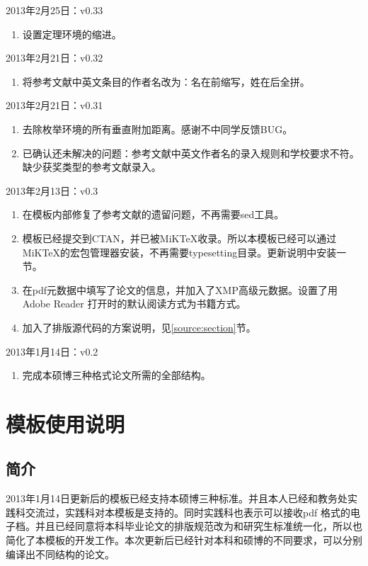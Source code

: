 \noindent
2013年2月25日：v0.33
\begin{enumerate}
\item 设置定理环境的缩进。
\end{enumerate}


\noindent
2013年2月21日：v0.32
\begin{enumerate}
\item 将参考文献中英文条目的作者名改为：名在前缩写，姓在后全拼。
\end{enumerate}

\noindent
2013年2月21日：v0.31
\begin{enumerate}
\item 去除枚举环境的所有垂直附加距离。感谢不中同学反馈BUG。
\item 已确认还未解决的问题：参考文献中英文作者名的录入规则和学校要求不符。缺少获奖类型的参考文献录入。
\end{enumerate}

\noindent
2013年2月13日：v0.3
\begin{enumerate}
\item 在模板内部修复了参考文献的遗留问题，不再需要sed工具。
\item 模板已经提交到CTAN，并已被MiKTeX收录。所以本模板已经可以通过MiKTeX的宏包管理器安装，不再需要typesetting目录。更新说明中安装一节。
\item 在pdf元数据中填写了论文的信息，并加入了XMP高级元数据。设置了用Adobe Reader 打开时的默认阅读方式为书籍方式。
\item 加入了排版源代码的方案说明，见\ref{source:section}节。
\end{enumerate}

\noindent
2013年1月14日：v0.2
\begin{enumerate}
\item 完成本硕博三种格式论文所需的全部结构。
\end{enumerate}

\chapter{模板使用说明}
\section{简介}
2013年1月14日更新后的模板已经支持本硕博三种标准。并且本人已经和教务处实践科交流过，实践科对本模板是支持的。同时实践科也表示可以接收pdf 格式的电子档。并且已经同意将本科毕业论文的排版规范改为和研究生标准统一化，所以也简化了本模板的开发工作。本次更新后已经针对本科和硕博的不同要求，可以分别编译出不同结构的论文。

